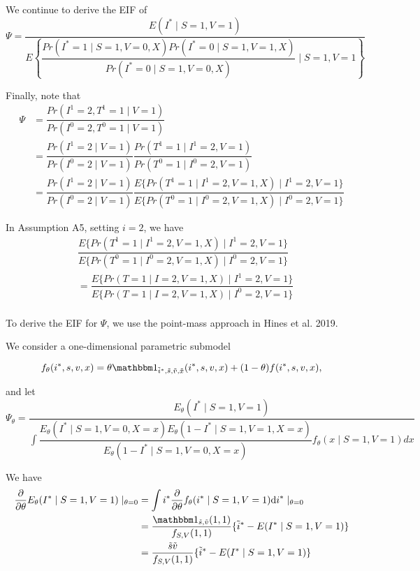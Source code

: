 \documentclass{article}
\begin{document}
We continue to derive the EIF of
$$\Psi = \dfrac{E(I^*\mid S=1, V=1)}{E\left\{\dfrac{Pr(I^*=1\mid S=1, V=0, X)Pr(I^*=0\mid S=1, V=1, X)}{Pr(I^*=0\mid S=1, V=0, X)}\mid S=1, V=1\right\}}$$

Finally, note that 
\begin{align*}
    \Psi &= \dfrac{Pr(I^1=2, T^1=1\mid V=1)}{Pr(I^0=2, T^0=1\mid V=1)}\\
    &= \dfrac{Pr(I^1=2\mid V=1)}{Pr(I^0=2\mid V=1)}\dfrac{Pr(T^1=1\mid I^1=2, V=1)}{Pr(T^0=1\mid I^0=2, V=1)}\\
    &= \dfrac{Pr(I^1=2\mid V=1)}{Pr(I^0=2\mid V=1)}\dfrac{E\{Pr(T^1=1\mid I^1=2, V=1, X)\mid I^1=2, V=1\}}{E\{Pr(T^0=1\mid I^0=2, V=1, X)\mid I^0=2, V=1\}}
\end{align*}

In Assumption A5, setting $i=2$, we have
\begin{align*}
    &\dfrac{E\{Pr(T^1=1\mid I^1=2, V=1, X)\mid I^1=2, V=1\}}{E\{Pr(T^0=1\mid I^0=2, V=1, X)\mid I^0=2, V=1\}}\\
    &= \dfrac{E\{Pr(T=1\mid I=2, V=1, X)\mid I^1=2, V=1\}}{E\{Pr(T=1\mid I=2, V=1, X)\mid I^0=2, V=1\}}\\
\end{align*}

To derive the EIF for $\Psi$, we use the point-mass approach in Hines et al. 2019.


We consider a one-dimensional parametric submodel

$$f_\theta(i^*, s, v, x)=\theta \mathbbm 1_{\tilde i^*, \tilde s, \tilde v, \tilde x}(i^*, s, v, x) + (1-\theta)f(i^*, s, v,x),$$

and let
$$\Psi_\theta = \dfrac{E_\theta(I^*\mid S=1, V=1)}{\int \dfrac{E_\theta(I^*\mid S=1, V=0, X=x)E_\theta(1-I^*\mid S=1, V=1, X=x)}{E_\theta(1-I^*\mid S=1, V=0, X=x)}f_\theta(x\mid S=1, V=1)dx}$$


We have
\begin{align*}
    \dfrac{\partial}{\partial\theta}E_\theta(I^*\mid S=1, V=1)\mid_{\theta=0} &= \int i^* \dfrac{\partial}{\partial\theta}f_\theta(i^*\mid S=1, V=1)\mathrm d i^*\mid_{\theta = 0}\\
    &= \dfrac{\mathbbm 1_{\tilde s,\tilde v}(1, 1)}{f_{S, V}(1, 1)}\{\tilde i^* - E(I^*\mid S=1, V=1)\}\\
    &= \dfrac{\tilde s\tilde v}{f_{S, V}(1, 1)}\{\tilde i^* - E(I^*\mid S=1, V=1)\}
\end{align*}
\end{document}
